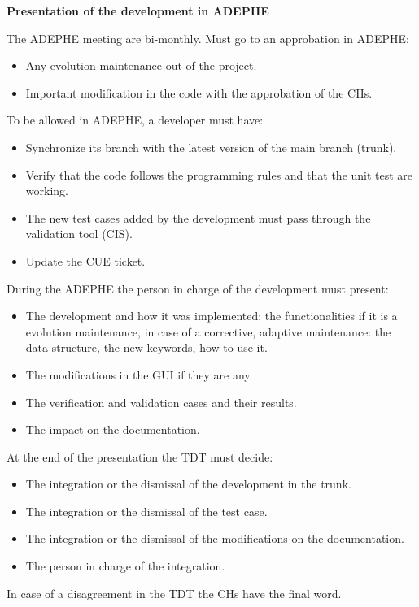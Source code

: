 \textbf{Presentation of the development in ADEPHE}

The ADEPHE meeting are bi-monthly.
Must go to an approbation in ADEPHE:
\begin{itemize}
\item Any evolution maintenance out of the \telemacsystem project.
\item Important modification in the code with the approbation of the CHs.
\end{itemize}

To be allowed in ADEPHE, a developer must have:
\begin{itemize}
\item Synchronize its branch with the latest version of the main branch
(trunk).
\item Verify that the code follows the programming rules and that the unit test
are working.
\item The new test cases added by the development must pass through the
validation tool (CIS).
\item Update the CUE ticket.
\end{itemize}

During the ADEPHE the person in charge of the development must present:
\begin{itemize}
\item The development and how it was implemented: the functionalities if it is a
evolution maintenance, in case of a corrective, adaptive
maintenance: the data structure, the new keywords, how to use it.
\item The modifications in the GUI if they are any.
\item The verification and validation cases and their results.
\item The impact on the documentation.
\end{itemize}

At the end of the presentation the TDT must decide:
\begin{itemize}
\item The integration or the dismissal of the development in the trunk.
\item The integration or the dismissal of the test case.
\item The integration or the dismissal of the modifications on the
documentation.
\item The person in charge of the integration.
\end{itemize}

In case of a disagreement in the TDT the CHs have the final word.

